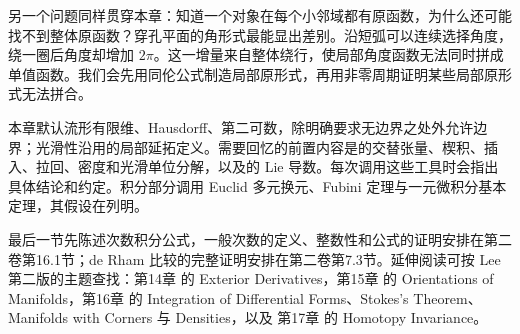 \ProseParagraphBreak

另一个问题同样贯穿本章：知道一个对象在每个小邻域都有原函数，为什么还可能找不到整体原函数？穿孔平面的角形式最能显出差别。沿短弧可以连续选择角度，绕一圈后角度却增加 \(2\pi\)。这一增量来自整体绕行，使局部角度函数无法同时拼成单值函数。我们会先用同伦公式制造局部原形式，再用非零周期证明某些局部原形式无法拼合。

\ProseParagraphBreak

本章默认流形有限维、Hausdorff、第二可数，除明确要求无边界之处外允许边界；光滑性沿用的局部延拓定义。需要回忆的前置内容是的交替张量、楔积、插入、拉回、密度和光滑单位分解，以及的 Lie 导数。每次调用这些工具时会指出具体结论和约定。积分部分调用 Euclid 多元换元、Fubini 定理与一元微积分基本定理，其假设在列明。

\ProseParagraphBreak

最后一节先陈述次数积分公式，一般次数的定义、整数性和公式的证明安排在第二卷第16.1节；de Rham 比较的完整证明安排在第二卷第7.3节。延伸阅读可按 Lee 第二版的主题查找：第14章 的 Exterior Derivatives，第15章 的 Orientations of Manifolds，第16章 的 Integration of Differential Forms、Stokes's Theorem、Manifolds with Corners 与 Densities，以及 第17章 的 Homotopy Invariance\cite[第14章, 第362--372页; 第15章, 第380--387页; 第16章, 第402--433页; 第17章, 第443--447页]{Lee2012Smooth}。







